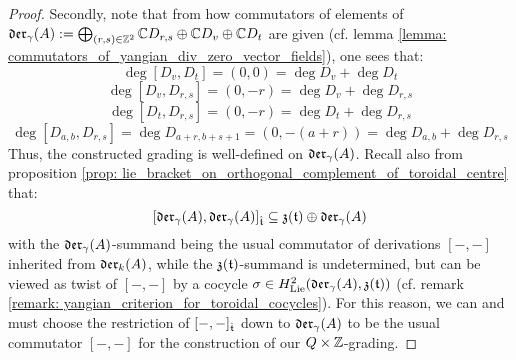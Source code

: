 \begin{proof}
                Secondly, note that from how commutators of elements of $\mathfrak{der}_{\gamma}(A) := \bigoplus_{(r, s) \in \mathbb{Z}^2} \mathbb{C} D_{r, s} \oplus \mathbb{C} D_v \oplus \mathbb{C} D_t$ are given (cf. lemma \ref{lemma: commutators_of_yangian_div_zero_vector_fields}), one sees that:
                    $$\deg [D_v, D_t] = (0, 0) = \deg D_v + \deg D_t$$
                    $$\deg [D_v, D_{r, s}] = (0, -r) = \deg D_v + \deg D_{r, s}$$
                    $$\deg [D_t, D_{r, s}] = (0, -r) = \deg D_t + \deg D_{r, s}$$
                    $$\deg [D_{a, b}, D_{r, s}] = \deg D_{a + r, b + s + 1} = (0, -(a + r)) = \deg D_{a, b} + \deg D_{r, s}$$
                Thus, the constructed grading is well-defined on $\mathfrak{der}_{\gamma}(A)$. Recall also from proposition \ref{prop: lie_bracket_on_orthogonal_complement_of_toroidal_centre} that:
                    $$[\mathfrak{der}_{\gamma}(A), \mathfrak{der}_{\gamma}(A)]_{\hat{\mathfrak{t}}} \subseteq \mathfrak{z}(\mathfrak{t}) \oplus \mathfrak{der}_{\gamma}(A)$$
                with the $\mathfrak{der}_{\gamma}(A)$-summand being the usual commutator of derivations $[-, -]$ inherited from $\mathfrak{der}_{k}(A)$, while the $\mathfrak{z}(\mathfrak{t})$-summand is undetermined, but can be viewed as twist of $[-, -]$ by a cocycle $\sigma \in H^2_{\mathrm{Lie}}(\mathfrak{der}_{\gamma}(A), \mathfrak{z}(\mathfrak{t}))$ (cf. remark \ref{remark: yangian_criterion_for_toroidal_cocycles}). For this reason, we can and must choose the restriction of $[-, -]_{\hat{\mathfrak{t}}}$ down to $\mathfrak{der}_{\gamma}(A)$ to be the usual commutator $[-, -]$ for the construction of our $Q \x \Z$-grading. 
            \end{proof}

